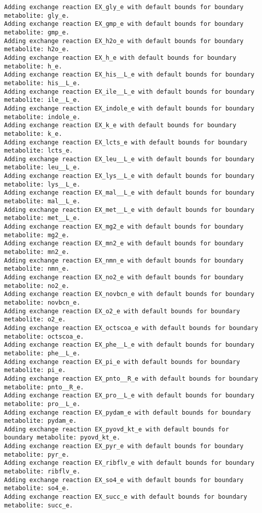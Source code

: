 \documentclass[
  letterpaper,
  DIV=11,
  numbers=noendperiod]{scrartcl}
\begin{document}
\begin{verbatim}
Adding exchange reaction EX_gly_e with default bounds for boundary metabolite: gly_e.
Adding exchange reaction EX_gmp_e with default bounds for boundary metabolite: gmp_e.
Adding exchange reaction EX_h2o_e with default bounds for boundary metabolite: h2o_e.
Adding exchange reaction EX_h_e with default bounds for boundary metabolite: h_e.
Adding exchange reaction EX_his__L_e with default bounds for boundary metabolite: his__L_e.
Adding exchange reaction EX_ile__L_e with default bounds for boundary metabolite: ile__L_e.
Adding exchange reaction EX_indole_e with default bounds for boundary metabolite: indole_e.
Adding exchange reaction EX_k_e with default bounds for boundary metabolite: k_e.
Adding exchange reaction EX_lcts_e with default bounds for boundary metabolite: lcts_e.
Adding exchange reaction EX_leu__L_e with default bounds for boundary metabolite: leu__L_e.
Adding exchange reaction EX_lys__L_e with default bounds for boundary metabolite: lys__L_e.
Adding exchange reaction EX_mal__L_e with default bounds for boundary metabolite: mal__L_e.
Adding exchange reaction EX_met__L_e with default bounds for boundary metabolite: met__L_e.
Adding exchange reaction EX_mg2_e with default bounds for boundary metabolite: mg2_e.
Adding exchange reaction EX_mn2_e with default bounds for boundary metabolite: mn2_e.
Adding exchange reaction EX_nmn_e with default bounds for boundary metabolite: nmn_e.
Adding exchange reaction EX_no2_e with default bounds for boundary metabolite: no2_e.
Adding exchange reaction EX_novbcn_e with default bounds for boundary metabolite: novbcn_e.
Adding exchange reaction EX_o2_e with default bounds for boundary metabolite: o2_e.
Adding exchange reaction EX_octscoa_e with default bounds for boundary metabolite: octscoa_e.
Adding exchange reaction EX_phe__L_e with default bounds for boundary metabolite: phe__L_e.
Adding exchange reaction EX_pi_e with default bounds for boundary metabolite: pi_e.
Adding exchange reaction EX_pnto__R_e with default bounds for boundary metabolite: pnto__R_e.
Adding exchange reaction EX_pro__L_e with default bounds for boundary metabolite: pro__L_e.
Adding exchange reaction EX_pydam_e with default bounds for boundary metabolite: pydam_e.
Adding exchange reaction EX_pyovd_kt_e with default bounds for boundary metabolite: pyovd_kt_e.
Adding exchange reaction EX_pyr_e with default bounds for boundary metabolite: pyr_e.
Adding exchange reaction EX_ribflv_e with default bounds for boundary metabolite: ribflv_e.
Adding exchange reaction EX_so4_e with default bounds for boundary metabolite: so4_e.
Adding exchange reaction EX_succ_e with default bounds for boundary metabolite: succ_e.

\end{verbatim}
\end{document}
